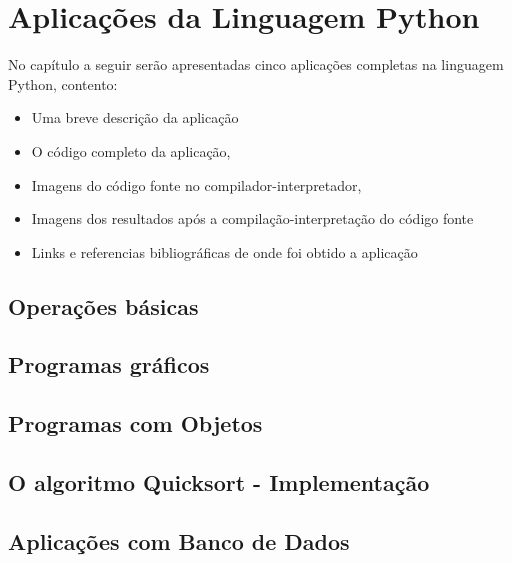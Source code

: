 


\chapter{ Aplica\c{c}\~{o}es da Linguagem Python}

No capítulo a seguir serão apresentadas cinco aplica\c{c}\~{o}es completas na linguagem Python, contento:
\begin{itemize}
  \item Uma breve descri\c{c}\~{a}o da aplica\c{c}\~{a}o
  \item O c\'{o}digo completo da aplica\c{c}\~{a}o,
  \item Imagens do c\'{o}digo fonte no compilador-interpretador,
  \item Imagens dos resultados ap\'{o}s a compila\c{c}\~{a}o-interpreta\c{c}\~{a}o do c\'{o}digo fonte
  \item Links e referencias bibliogr\'{a}ficas de onde foi obtido a aplica\c{c}\~{a}o
\end{itemize}




    \section{Opera\c{c}\~{o}es b\'{a}sicas}


    \section{Programas gr\'{a}ficos}


    \section{Programas com Objetos}


    \section{O algoritmo Quicksort - Implementa\c{c}\~{a}o}


    \section{Aplica\c{c}\~{o}es com Banco de Dados}

